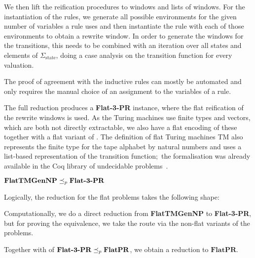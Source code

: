 We then lift the reification procedures to windows and lists of windows.
For the instantiation of the rules, we generate all possible environments for the given number of variables a rule uses and then instantiate the rule with each of those environments to obtain a rewrite window.
In order to generate the windows for the transitions, this needs to be combined with an iteration over all states and elements of $\Sigma_{\text{state}}$, doing a case analysis on the transition function for every valuation.

The proof of agreement with the inductive rules can mostly be automated and only requires the manual choice of an assignment to the variables of a rule.

The full reduction produces a \textbf{Flat-3-PR} instance, where the flat reification of the rewrite windows is used. As the Turing machines use finite types and vectors, which are both not directly extractable, we also have a flat encoding of these together with a flat variant  of \gennp{}. 
The definition of flat Turing machines \textsf{TM} also represents the finite type for the tape alphabet by natural numbers and uses a list-based representation of the transition function;\ the formalisation was already available in the Coq library of undecidable problems~\cite{coq_undec}. 

\begin{theorem}
  $\textbf{FlatTMGenNP} \preceq_p{} \textbf{Flat-3-PR}$
\end{theorem}

Logically, the reduction for the flat problems takes the following shape: 
\begin{center}
\end{center}
Computationally, we do a direct reduction from \textbf{FlatTMGenNP} to \textbf{Flat-3-PR}, but for proving the equivalence, we take the route via the non-flat variants of the problems. 

Together with  of $\textbf{Flat-3-PR} \preceq_p{} \textbf{FlatPR}$, we obtain a reduction to $\textbf{FlatPR}$.


